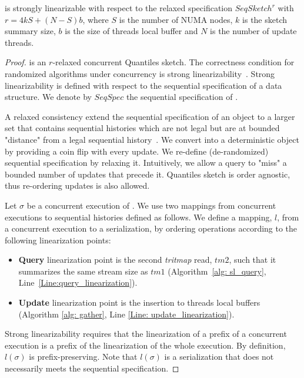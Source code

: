 \begin{lemma} \label{Lem: sl_relaxation}
\mysketch is strongly linearizable with respect to the relaxed specification $SeqSketch^r$ with \(r=4kS + (N-S)b\), where $S$ is the number of NUMA nodes, $k$ is the sketch summary size, $b$ is the size of threads local buffer and $N$ is the number of update threads.
\end{lemma}
\begin{proof}
\mysketch is an $r$-relaxed concurrent Quantiles sketch. The correctness condition for randomized algorithms under concurrency is strong linearizability~\cite{strong_linearizability}. Strong linearizability is defined with respect to the sequential specification of a data structure. We denote by $\mathit{SeqSpec}$ the sequential specification of \mysketch.


A relaxed consistency extend the sequential specification of an object to a larger set that contains sequential histories which are not legal but are at bounded "distance" from a legal sequential history~\cite{Henzinger_2013_Quantitative_Relaxation,Afek_2010_Quasi_linearizability,Rinberg_2020_fast_sketches}. We convert \mysketch into a deterministic object by providing a coin flip with every update. We re-define (de-randomized) \mysketch sequential specification by relaxing it. Intuitively, we allow a query to "miss" a bounded number of updates that precede it. Quantiles sketch is order agnostic, thus re-ordering updates is also allowed. 

Let $\sigma$ be a concurrent execution of \mysketch. We use two mappings from concurrent executions to sequential histories defined as follows.
We define a mapping, $l$, from a concurrent execution to a serialization, by ordering operations according to the following linearization points:
\begin{itemize}
\item \textbf{Query} linearization point is the second \emph{tritmap} read, $tm2$, such that it summarizes the same stream size as $tm1$ (Algorithm~\ref{alg: sl_query}, Line~\ref{Line:query_linearization}).
\item \textbf{Update} linearization point is the insertion to threads local buffers (Algorithm \ref{alg: gather}, Line \ref{Line: update_linearization}).
\end{itemize}

Strong linearizability requires that the linearization of a prefix of a concurrent execution is a prefix of the linearization of the whole execution. By definition, $l(\sigma)$ is prefix-preserving. Note that $l(\sigma)$ is a serialization that does not necessarily meets the sequential specification.


\end{proof}
